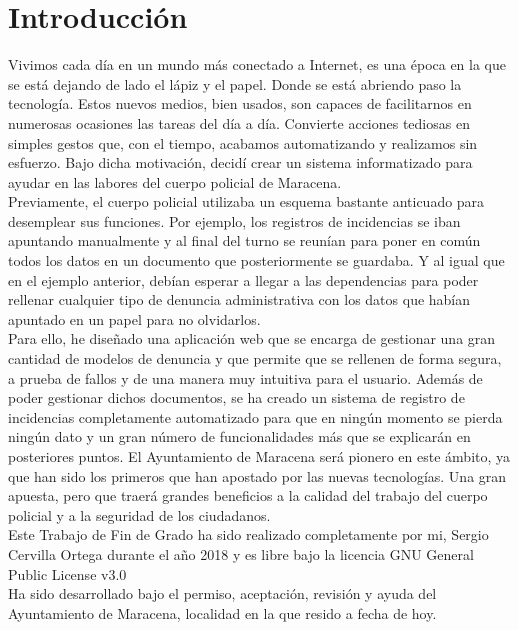 \chapter{Introducción}

Vivimos cada día en un mundo más conectado a Internet, es una época en la que se está dejando de 
lado el lápiz y el papel. Donde se está abriendo paso la tecnología. Estos nuevos medios, bien
usados, son capaces de facilitarnos en numerosas ocasiones las tareas del día a día. Convierte acciones
tediosas en simples gestos que, con el tiempo, acabamos automatizando y realizamos sin esfuerzo. 
Bajo dicha motivación, decidí crear un sistema informatizado para ayudar en las labores del cuerpo policial de Maracena.\\

Previamente, el cuerpo policial utilizaba un esquema bastante anticuado para desemplear sus funciones.
Por ejemplo, los registros de incidencias se iban apuntando manualmente y al final del turno
se reunían para poner en común todos los datos en un documento que posteriormente se guardaba.
Y al igual que en el ejemplo anterior, debían esperar a llegar a las dependencias para poder 
rellenar cualquier tipo de denuncia administrativa con los datos que habían apuntado en 
un papel para no olvidarlos.\\

Para ello, he diseñado una aplicación web que se encarga de gestionar una gran cantidad de 
modelos de denuncia y que permite que se rellenen de forma segura, a prueba de 
fallos y de una manera muy intuitiva para el usuario. Además de poder gestionar dichos documentos,
se ha creado un sistema de registro de incidencias completamente automatizado para que en 
ningún momento se pierda ningún dato y un gran número de funcionalidades más que se explicarán en 
posteriores puntos. El Ayuntamiento de Maracena será pionero en este ámbito, ya que han sido los 
primeros que han apostado por las nuevas tecnologías. Una gran apuesta, pero que traerá grandes
beneficios a la calidad del trabajo del cuerpo policial y a la seguridad de los ciudadanos. \\

Este Trabajo de Fin de Grado ha sido realizado completamente por mi, Sergio 
Cervilla Ortega durante el año 2018 y es libre bajo la licencia GNU General Public License v3.0 \cite{gplv3}\\ 

Ha sido desarrollado bajo el permiso, aceptación, revisión y ayuda del Ayuntamiento de Maracena, localidad en
la que resido a fecha de hoy.\\

